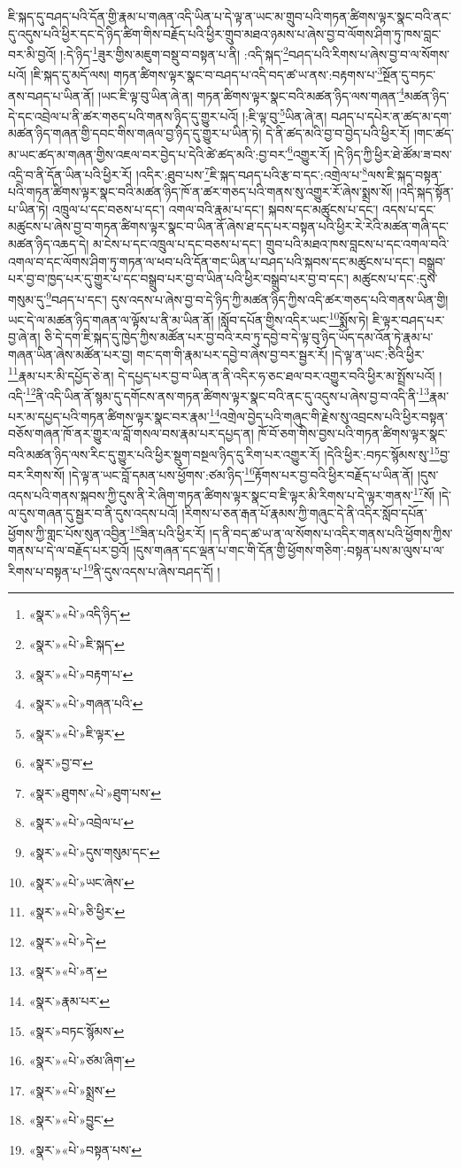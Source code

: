 ཇི་སྐད་དུ་བཤད་པའི་དོན་གྱི་རྣམ་པ་གཞན་འདི་ཡིན་པ་དེ་ལྟ་ན་ཡང་མ་གྲུབ་པའི་གཏན་ཚིགས་ལྟར་སྣང་བའི་ནང་དུ་འདུས་པའི་ཕྱིར་དང་དེ་ཉིད་ཚིག་གིས་བརྗོད་པའི་ཕྱིར་གྲུབ་མཐའ་ཉམས་པ་ཞེས་བྱ་བ་ལོགས་ཤིག་ཏུ་ཁས་བླང་བར་མི་བྱའོ། །:དེ་ཉིད་\footnote{«སྣར་»«པེ་»འདི་ཉིད་}ཟུར་གྱིས་མཇུག་བསྡུ་བ་བསྟན་པ་ནི། :འདི་སྐད་\footnote{«སྣར་»«པེ་»ཇི་སྐད་}བཤད་པའི་རིགས་པ་ཞེས་བྱ་བ་ལ་སོགས་པའོ། །ཇི་སྐད་དུ་མདོ་ལས། གཏན་ཚིགས་ལྟར་སྣང་བ་བཤད་པ་འདི་བད་ཚ་ཡ་ནས་:བརྟགས་པ་\footnote{«སྣར་»«པེ་»བརྟག་པ་}སྔོན་དུ་བཏང་ནས་བཤད་པ་ཡིན་ནོ། །ཡང་ཇི་ལྟ་བུ་ཡིན་ཞེ་ན། གཏན་ཚིགས་ལྟར་སྣང་བའི་མཚན་ཉིད་ལས་གཞན་\footnote{«སྣར་»«པེ་»གཞན་པའི་}མཚན་ཉིད་དེ་དང་འབྲེལ་པ་ནི་ཚར་གཅད་པའི་གནས་ཉིད་དུ་གྱུར་པའོ། །:ཇི་ལྟ་བུ་\footnote{«སྣར་»«པེ་»ཇི་ལྟར་}ཡིན་ཞེ་ན། བཤད་པ་དཔེར་ན་ཚད་མ་དག་མཚན་ཉིད་གཞན་གྱི་དབང་གིས་གཞལ་བྱ་ཉིད་དུ་གྱུར་པ་ཡིན་ཏེ། དེ་ནི་ཚད་མའི་བྱ་བ་བྱེད་པའི་ཕྱིར་རོ། །གང་ཚད་མ་ཡང་ཚད་མ་གཞན་གྱིས་འཇལ་བར་བྱེད་པ་དེའི་ཚེ་ཚད་མའི་:བྱ་བར་\footnote{«སྣར་»བྱ་བ་}འགྱུར་རོ། །དེ་ཉིད་ཀྱི་ཕྱིར་ཐེ་ཚོམ་ཟ་བས་འདྲི་བ་ནི་དོན་ཡིན་པའི་ཕྱིར་རོ། །འདིར་:ཐུབ་པས་\footnote{«སྣར་»ཐུགས་«པེ་»ཐུག་པས་}ཇི་སྐད་བཤད་པའི་རྩ་བ་དང་:འགྲེལ་པ་\footnote{«སྣར་»«པེ་»འབྲེལ་པ་}ལས་ཇི་སྐད་བསྟན་པའི་གཏན་ཚིགས་ལྟར་སྣང་བའི་མཚན་ཉིད་ཁོ་ན་ཚར་གཅད་པའི་གནས་སུ་འགྱུར་རོ་ཞེས་སྨྲས་སོ། །འདི་སྐད་སྟོན་པ་ཡིན་ཏེ། འཁྲུལ་པ་དང་བཅས་པ་དང་། འགལ་བའི་རྣམ་པ་དང་། སྐབས་དང་མཚུངས་པ་དང་། འདས་པ་དང་མཚུངས་པ་ཞེས་བྱ་བ་གཏན་ཚིགས་ལྟར་སྣང་བ་ཡིན་ནོ་ཞེས་ཐ་དད་པར་བསྟན་པའི་ཕྱིར་རེ་རེའི་མཚན་གཞི་དང་མཚན་ཉིད་འཆད་དེ། མ་ངེས་པ་དང་འཁྲུལ་པ་དང་བཅས་པ་དང་། གྲུབ་པའི་མཐའ་ཁས་བླངས་པ་དང་འགལ་བའི་འགལ་བ་དང་ལོགས་ཤིག་ཏུ་གཏན་ལ་ཕབ་པའི་དོན་གང་ཡིན་པ་བཤད་པའི་སྐབས་དང་མཚུངས་པ་དང་། བསྒྲུབ་པར་བྱ་བ་ཁྱད་པར་དུ་གྱུར་པ་དང་བསྒྲུབ་པར་བྱ་བ་ཡིན་པའི་ཕྱིར་བསྒྲུབ་པར་བྱ་བ་དང་། མཚུངས་པ་དང་:དུས་གསུམ་དུ་\footnote{«སྣར་»«པེ་»དུས་གསུམ་དང་}བཤད་པ་དང་། དུས་འདས་པ་ཞེས་བྱ་བ་དེ་ཉིད་ཀྱི་མཚན་ཉིད་ཀྱིས་འདི་ཚར་གཅད་པའི་གནས་ཡིན་གྱི། ཡང་དེ་ལ་མཚན་ཉིད་གཞན་ལ་ལྟོས་པ་ནི་མ་ཡིན་ནོ། །སློབ་དཔོན་གྱིས་འདིར་ཡང་\footnote{«སྣར་»«པེ་»ཡང་ཞེས་}སྨོས་ཏེ། ཇི་ལྟར་བཤད་པར་བྱ་ཞེ་ན། ཅི་དེ་དག་ཇི་སྐད་དུ་ཁྱེད་ཀྱིས་མཚོན་པར་བྱ་བའི་རབ་ཏུ་དབྱེ་བ་དེ་ལྟ་བུ་ཉིད་ཡོད་དམ་འོན་ཏེ་རྣམ་པ་གཞན་ཡིན་ཞེས་མཚོན་པར་བྱ། གང་དག་གི་རྣམ་པར་དབྱེ་བ་ཞེས་བྱ་བར་སྦྱར་རོ། །དེ་ལྟ་ན་ཡང་:ཅིའི་ཕྱིར་\footnote{«སྣར་»«པེ་»ཅི་ཕྱིར་}རྣམ་པར་མི་དཔྱོད་ཅེ་ན། དེ་དཔྱད་པར་བྱ་བ་ཡིན་ན་ནི་འདིར་ཧ་ཅང་ཐལ་བར་འགྱུར་བའི་ཕྱིར་མ་སྤྲོས་པའོ། །འདི་\footnote{«སྣར་»«པེ་»དེ་}ནི་འདི་ཡིན་ནོ་སྙམ་དུ་དགོངས་ནས་གཏན་ཚིགས་ལྟར་སྣང་བའི་ནང་དུ་འདུས་པ་ཞེས་བྱ་བ་འདི་ནི་\footnote{«སྣར་»«པེ་»ན་}རྣམ་པར་མ་དཔྱད་པའི་གཏན་ཚིགས་ལྟར་སྣང་བར་རྣམ་\footnote{«སྣར་»རྣམ་པར་}འགྲེལ་བྱེད་པའི་གཞུང་གི་རྗེས་སུ་འབྲངས་པའི་ཕྱིར་བསྟན་བཅོས་གཞན་ཁོ་ནར་གྱུར་ལ་བློ་གསལ་བས་རྣམ་པར་དཔྱད་ན། ཁོ་བོ་ཅག་གིས་བྱས་པའི་གཏན་ཚིགས་ལྟར་སྣང་བའི་མཚན་ཉིད་ལས་རིང་དུ་གྱུར་པའི་ཕྱིར་སྡུག་བསྔལ་ཉིད་དུ་རིག་པར་འགྱུར་རོ། །དེའི་ཕྱིར་:བཏང་སྙོམས་སུ་\footnote{«སྣར་»བཏང་སྙོམས་}བྱ་བར་རིགས་སོ། །དེ་ལྟ་ན་ཡང་བློ་དམན་པས་ཕྱོགས་:ཙམ་ཉིད་\footnote{«སྣར་»«པེ་»ཙམ་ཞིག་}རྟོགས་པར་བྱ་བའི་ཕྱིར་བརྗོད་པ་ཡིན་ནོ། །དུས་འདས་པའི་གནས་སྐབས་ཀྱི་དུས་ནི་རེ་ཞིག་གཏན་ཚིགས་ལྟར་སྣང་བ་ཇི་ལྟར་མི་རིགས་པ་དེ་ལྟར་གནས་\footnote{«སྣར་»«པེ་»སྨྲས་}སོ། །དེ་ལ་དུས་གཞན་དུ་སྦྱར་བ་ནི་དུས་འདས་པའོ། །རིགས་པ་ཅན་རྒན་པོ་རྣམས་ཀྱི་གཞུང་དེ་ནི་འདིར་སློབ་དཔོན་ཕྱོགས་ཀྱི་གླང་པོས་སུན་འབྱིན་\footnote{«སྣར་»«པེ་»བྱུང་}ཟིན་པའི་ཕྱིར་རོ། །ད་ནི་བད་ཚ་ཡ་ན་ལ་སོགས་པ་འདིར་གནས་པའི་ཕྱོགས་ཀྱིས་གནས་པ་དེ་ལ་བརྗོད་པར་བྱའོ། །དུས་གཞན་དང་ལྡན་པ་གང་གི་དོན་གྱི་ཕྱོགས་གཅིག་:བསྟན་པས་མ་ལུས་པ་ལ་རིགས་པ་བསྟན་པ་\footnote{«སྣར་»«པེ་»བསྟན་པས་}ནི་དུས་འདས་པ་ཞེས་བཤད་དོ། །
